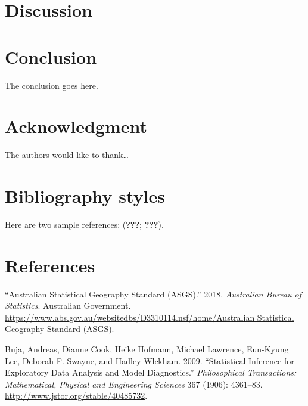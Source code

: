 \documentclass[conference,final,]{IEEEtran}
\begin{document}
\hypertarget{discussion}{%
\section{Discussion}\label{discussion}}

\hypertarget{conclusion}{%
\section{Conclusion}\label{conclusion}}

The conclusion goes here.

\hypertarget{acknowledgment}{%
\section{Acknowledgment}\label{acknowledgment}}

The authors would like to thank\ldots{}

\hypertarget{bibliography-styles}{%
\section{Bibliography styles}\label{bibliography-styles}}

Here are two sample references: ({\textbf{???}}; {\textbf{???}}).

\newpage

\hypertarget{references}{%
\section{References}\label{references}}

\hypertarget{refs}{}
\leavevmode\hypertarget{ref-abs2016}{}%
``Australian Statistical Geography Standard (ASGS).'' 2018.
\emph{Australian Bureau of Statistics}. Australian Government.
\href{https://www.abs.gov.au/websitedbs/D3310114.nsf/home/Australian\%20\%20\%20Statistical\%20Geography\%20Standard\%20(ASGS)}{https://www.abs.gov.au/websitedbs/D3310114.nsf/home/Australian   Statistical Geography Standard (ASGS)}.

\leavevmode\hypertarget{ref-SIEDAMD}{}%
Buja, Andreas, Dianne Cook, Heike Hofmann, Michael Lawrence, Eun-Kyung
Lee, Deborah F. Swayne, and Hadley Wlckham. 2009. ``Statistical
Inference for Exploratory Data Analysis and Model Diagnostics.''
\emph{Philosophical Transactions: Mathematical, Physical and Engineering
Sciences} 367 (1906): 4361--83.
\url{http://www.jstor.org/stable/40485732}.
\end{document}
